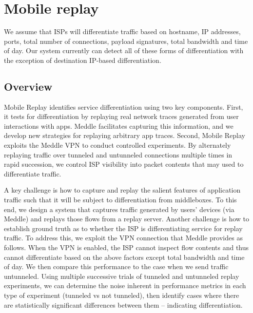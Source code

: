 \documentclass[letterpaper]{sig-alternate-2013}
\begin{document}
\section{Mobile replay}
\label{sec:method}

We assume that ISPs will differentiate traffic based on hostname, IP addresses, ports, total number of connections, payload signatures, total bandwidth and time of day. Our system currently can detect all of these forms of differentiation with the exception of destination IP-based differentiation.

\subsection{Overview} Mobile Replay identifies service differentiation using two key components. First, it tests for differentiation by replaying real network traces generated from user interactions with apps. Meddle \cite{meddle} facilitates capturing this information, and we develop new strategies for replaying arbitrary app traces. Second, Mobile Replay exploits the Meddle VPN to conduct controlled experiments. By alternately replaying traffic over tunneled and untunneled connections multiple times in rapid succession, we control ISP visibility into packet contents that may used to differentiate traffic.

A key challenge is how to capture and replay the salient features of application traffic such that it will be subject to differentiation from middleboxes. To this end, we design a system that captures traffic generated by users' devices (via Meddle) and replays those flows from a replay server. Another challenge is how to establish ground truth as to whether the ISP is differentiating service for replay traffic. To address this, we exploit the VPN connection that Meddle provides as follows. When the VPN is enabled, the ISP cannot inspect flow contents and thus cannot differentiate based on the above factors except total bandwidth and time of day. We then compare this performance to the case when we send traffic untunneled. Using multiple successive trials of tunneled and untunneled replay experiments, we can determine the noise inherent in performance metrics in each type of experiment (tunneled vs not tunneled), then identify cases where there are statistically significant differences between them -- indicating differentiation.
\end{document}
